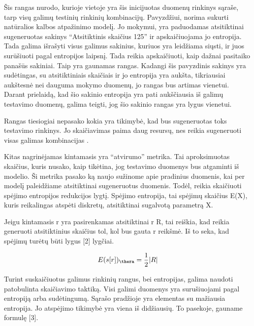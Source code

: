 \documentclass{VUMIFInfBakalaurinis}
\begin{document}
\par Šis rangas nurodo, kurioje vietoje yra šis inicijuotas duomenų rinkinys sąraše, tarp visų galimų testinių rinkinių kombinacijų. Pavyzdžiui, norima 
sukurti natūralios kalbos atpažinimo modelį. Jo mokymui, yra paduodamas atsitiktinai sugeneruotas sakinys \enquote{Atsitiktinis skaičius 125} ir apskaičiuojama jo entropija. Tada galima išrašyti visus galimus sakinius, kuriuos yra leidžiama siųsti, ir juos surūšiuoti pagal entropijos laipsnį. Tada reikia apskaičiuoti, kaip dažnai pasitaiko panašūs sakiniai. Taip yra gaunamas rangas. Kadangi šis pavyzdinis sakinys yra sudėtingas, su atsitiktiniais skaičiais ir jo entropija yra aukšta, tikriausiai aukštesnė nei dauguma mokymo duomenų, jo rangas bus artimas vienetui. Darant prielaidą, kad šio sakinio entropija yra pati aukščiausia iš galimų testavimo duomenų, galima teigti, jog šio sakinio rangas yra lygus vienetui.
\par Rangas tiesiogiai nepasako kokia yra tikimybė, kad bus sugeneruotas toks testavimo rinkinys. Jo skaičiavimas paima daug resursų, nes reikia sugeneruoti visas galimas kombinacijas \cite{8}.
\par Kitas nagrinėjamas kintamasis yra \enquote{atvirumo} metrika. Tai aproksimuotas skaičius, kuris nusako, kaip tikėtina, jog testavimo duomenys bus atgaminti iš modelio. Ši metrika pasako ką naujo sužinome apie pradinius duomenis, kai per modelį paleidžiame atsitiktinai sugeneruotus duomenis. Todėl, reikia skaičiuoti spėjimo entropijos redukcijos lygtį. Spėjimo entropija, tai spėjimų skaičius E(X), kuris reikalingas atspėti diskretų, atsitiktinai sugalvotą parametrą X.
\par Jeigu kintamasis r yra pasirenkamas atsitiktinai r \in R, tai reiškia, kad reikia generuoti atsitiktinius skaičius tol, kol bus gauta r reikšmė. Iš to seka, kad spėjimų turėtų būti lygus [2] lygčiai.

\begin{equation}
E(s[r])_{\thera} = \frac{1}{2}| R |
\label{eq:lygtis2}
\end{equation}

\par Turint suskaičiuotus galimus rinkinių rangus, bei entropijas, galima naudoti patobulinta skaičiavimo taktiką. Visi galimi duomenys yra surušiuojami pagal entropiją arba sudėtingumą. Sąrašo pradžioje yra elementas su mažiausia entropija. Jo atspėjimo tikimybė yra viena iš didžiausių. To pasekoje, gauname formulę [3].
\end{document}
